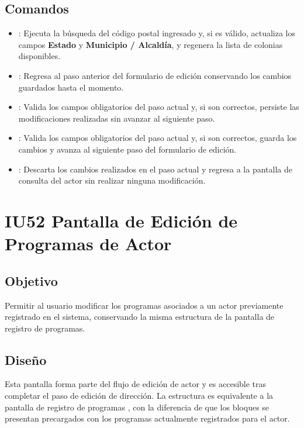 \subsection{Comandos}
\begin{itemize}
	\item {}: Ejecuta la búsqueda del código postal ingresado y, 
	si es válido, actualiza los campos \textbf{Estado} y \textbf{Municipio / 
		Alcaldía}, y regenera la lista de colonias disponibles.
	\item {}: Regresa al paso anterior del formulario de 
	edición conservando los cambios guardados hasta el momento.
	\item {}: Valida los campos obligatorios del paso 
	actual y, si son correctos, persiste las modificaciones realizadas sin 
	avanzar al siguiente paso.
	\item {}: Valida los campos obligatorios del paso actual 
	y, si son correctos, guarda los cambios y avanza al siguiente paso del 
	formulario de edición.
	\item {}: Descarta los cambios realizados en el paso actual 
	y regresa a la pantalla de consulta del actor  sin realizar ninguna modificación.
\end{itemize}

\section{IU52 Pantalla de Edición de Programas de Actor}
\subsection{Objetivo}
Permitir al usuario modificar los programas asociados a un actor previamente 
registrado en el sistema, conservando la misma estructura de la pantalla de 
registro de programas.

\subsection{Diseño}
Esta pantalla  forma 
parte del flujo de edición de actor y es accesible tras completar el paso de 
edición de dirección. La estructura es equivalente a la pantalla de registro 
de programas , con la 
diferencia de que los bloques se presentan precargados con los programas 
actualmente registrados para el actor.

